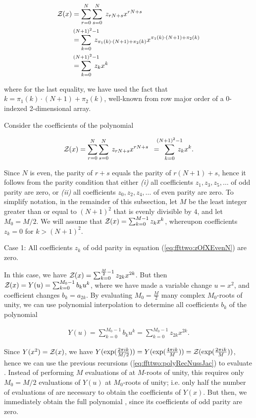 \begin{align}
\label{eq:ffttwo:polyRecEvenN}
\begin{split}
\emZ{} &= \sum_{r=0}^{N} \sum_{s=0}^{N}\; z_{rN+s} x^{rN+s} \\
&=
\sum_{k=0}^{\mathclap{(N+1)^2-1}}\; z_{\pi_1(k)\cdot (N+1) + \pi_2(k)}
x^{\pi_1(k)\cdot (N+1) + \pi_2(k)} \\
&=
\sum_{k=0}^{\mathclap{(N+1)^2-1}}\; z_k x^k
\end{split}
\end{align}

where for the last equality, we have used the fact that
$k = \pi_1(k)\cdot (N+1)+\pi_2(k)$, well-known from
row major order of a 0-indexed 2-dimensional array.

Consider the coefficients of the polynomial

\begin{align}
\label{eq:ffttwo:zOfXEvenN}
\emZ{} = \sum_{r=0}^{N} \sum_{s=0}^{N}\; z_{rN+s} x^{rN+s}
\enspace=\enspace\sum_{k=0}^{\mathclap{(N+1)^2-1}}\; z_k x^k.
\end{align}

Since $N$ is even, the parity of $r+s$ equals the parity of
$r(N+1)+s$, hence  it follows from the parity condition that either
{\em (i)} all coefficients $z_1,z_3,z_5,\dots$ of odd parity are zero,
or {\em (ii)} all coefficients $z_0,z_2,z_4,\dots$ of even parity are zero.
To simplify notation, in the remainder of this subsection, let $M$ be
the least integer greater than or equal to $(N+1)^2$ that is evenly divisible
by $4$, and let $M_0=M/2$. We will assume that ${\mathcal Z}_{}(x) = \sum_{k=0}^{M-1}
z_k x^k$, whereupon coefficients $z_k=0$ for $k>(N+1)^2$.

\medskip
{\sc Case 1}: All coefficients $z_k$ of odd parity in
equation (\ref{eq:ffttwo:zOfXEvenN}) are zero.
\smallskip

In this case, we have
${\mathcal Z}_{}(x) = \sum_{k=0}^{\frac{M}{2}-1} z_{2k} x^{2k}$. But then
${\mathcal Z}_{}(x) = Y(u) = \sum_{k=0}^{M_0-1} b_k u^k$,
where we have made a variable change $u=x^2$, and coefficient changes
$b_k = a_{2k}$.
By evaluating $M_0=\frac{M}{2}$ many complex
$M_0$-roots of unity, we can
use polynomial interpolation to determine all coefficients $b_k$ of
the polynomial

\begin{align}
Y(u) = \sum_{k=0}^{M_0-1} b_k u^k = \sum_{k=0}^{M_0-1} z_{2k} x^{2k}.
\end{align}

Since $Y(x^2)={\mathcal Z}_{}(x)$, we have
$Y(\exp(\frac{2\pi i k}{M/2})) =
Y(\exp(\frac{4\pi i k}{M})) =
{\mathcal Z}_{}(\exp(\frac{2\pi i k}{M}))$, hence we can
use the previous recursions (\ref{eq:ffttwo:polyRecNussJac})
to evaluate .  Instead of
performing $M$ evaluations of \emZ{} at $M$-roots of unity,
this requires only $M_0=M/2$ evaluations of $Y(u)$ at
$M_0$-roots of unity; i.e. only half the number of
evaluations of \emZ{} are necessary to
obtain the coefficients of $Y(x)$. But then, we immediately obtain the
full polynomial \emZ{}, since its coefficients of odd parity are zero.

